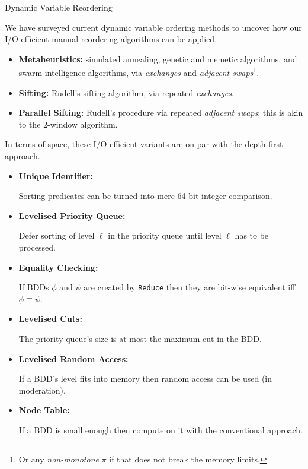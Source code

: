 \documentclass[english, aspectratio=169]{beamer}
\begin{document}
\begin{frame}[t]{Dynamic Variable Reordering}

  We have surveyed current dynamic variable ordering methods to uncover how our
  I/O-efficient manual reordering algorithms can be applied.
  \begin{itemize}
  \item[] \textbf{Metaheuristics:} simulated annealing, genetic and memetic
    algorithms, and swarm intelligence algorithms, via \emph{exchanges} and
    \emph{adjacent swaps}\footnote{Or any \emph{non-monotone} $\pi$ if that
      does not break the memory limits.}.

  \item[] \textbf{Sifting:} Rudell's sifting algorithm, via repeated
    \emph{exchanges}.

  \item[] \textbf{Parallel Sifting:} Rudell's procedure via repeated
    \emph{adjacent swaps}; this is akin to the 2-window algorithm.
  \end{itemize}

  \smallskip

  In terms of space, these I/O-efficient variants are on par with the
  depth-first approach.
\end{frame}

\blankframe

\begin{frame}
  \begin{itemize}
  \item \textbf{Unique Identifier:}

    \small Sorting predicates can be turned into mere 64-bit integer
    comparison.

  \item \textbf{Levelised Priority Queue:}

    \small Defer sorting of level $\ell$ in the priority queue until level
    $\ell$ has to be processed.

  \item \textbf{Equality Checking:}

    \small If BDDs $\phi$ and $\psi$ are created by \texttt{Reduce} then they
    are bit-wise equivalent iff $\phi \equiv \psi$.

  \item \textbf{Levelised Cuts:}

    \small The priority queue's size is at most the maximum cut in the BDD.

  \item \textbf{Levelised Random Access:}

    \small If a BDD's level fits into memory then random access can be used (in
    moderation).

  \item \textbf{Node Table:}

    \small If a BDD is small enough then compute on it with the conventional
    approach.
  \end{itemize}
\end{frame}
\end{document}

